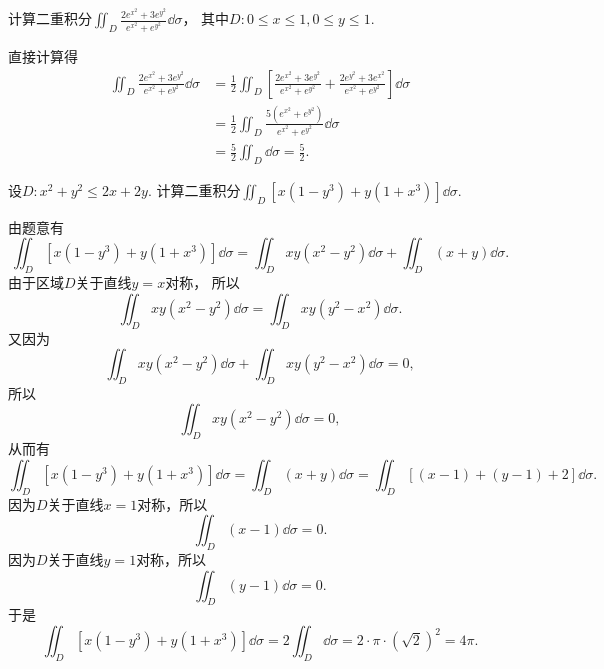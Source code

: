 \begin{example}
计算二重积分\(\iint_D \frac{2 e^{x^2} + 3 e^{y^2}}{e^{x^2} + e^{y^2}} \dd\sigma\)，
其中\(D: 0 \leq x \leq 1, 0 \leq y \leq 1\).
\begin{solution}
直接计算得\begin{align*}
	\iint_D \frac{2 e^{x^2} + 3 e^{y^2}}{e^{x^2} + e^{y^2}} \dd\sigma
	&= \frac12 \iint_D \left[
		\frac{2 e^{x^2} + 3 e^{y^2}}{e^{x^2} + e^{y^2}}
		+ \frac{2 e^{y^2} + 3 e^{x^2}}{e^{x^2} + e^{y^2}}
	\right] \dd\sigma \\
	&= \frac12 \iint_D \frac{5 (e^{x^2} + e^{y^2})}{e^{x^2} + e^{y^2}} \dd\sigma \\
	&= \frac52 \iint_D \dd\sigma
	= \frac52.
\end{align*}
\end{solution}
\end{example}

\begin{example}
设\(D: x^2+y^2\leq2x+2y\).
计算二重积分\(\iint_D [x(1-y^3)+y(1+x^3)] \dd\sigma\).
\begin{solution}
由题意有\[
	\iint_D [x(1-y^3)+y(1+x^3)] \dd\sigma
	= \iint_D xy(x^2-y^2) \dd\sigma
	+ \iint_D (x+y) \dd\sigma.
\]
由于区域\(D\)关于直线\(y=x\)对称，
所以\[
	\iint_D xy(x^2-y^2) \dd\sigma
	= \iint_D xy(y^2-x^2) \dd\sigma.
\]
又因为\[
	\iint_D xy(x^2-y^2) \dd\sigma
	+ \iint_D xy(y^2-x^2) \dd\sigma
	= 0,
\]
所以\[
	\iint_D xy(x^2-y^2) \dd\sigma
	= 0,
\]
从而有\[
	\iint_D [x(1-y^3)+y(1+x^3)] \dd\sigma
	= \iint_D (x+y) \dd\sigma
	= \iint_D [(x-1)+(y-1)+2] \dd\sigma.
\]
因为\(D\)关于直线\(x=1\)对称，所以\[
	\iint_D (x-1) \dd\sigma
	= 0.
\]
因为\(D\)关于直线\(y=1\)对称，所以\[
	\iint_D (y-1) \dd\sigma
	= 0.
\]
于是\[
	\iint_D [x(1-y^3)+y(1+x^3)] \dd\sigma
	= 2 \iint_D \dd\sigma
	= 2 \cdot \pi \cdot (\sqrt2)^2
	= 4\pi.
\]
\end{solution}
\end{example}


